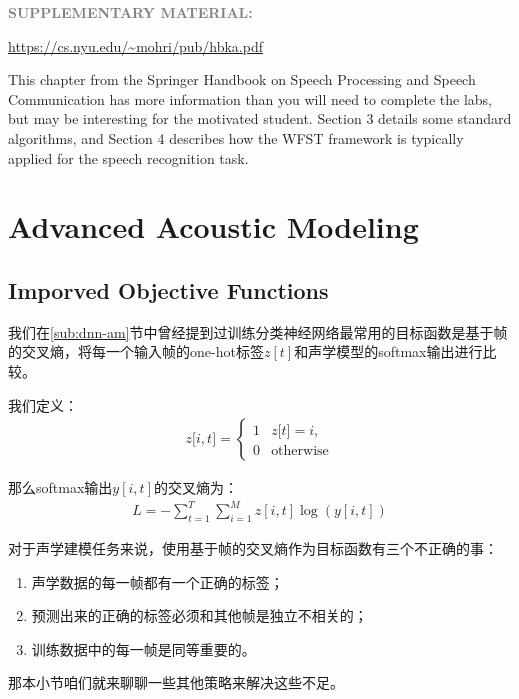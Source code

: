 {{\bf \textcolor{gray}{SUPPLEMENTARY MATERIAL:}}

\url{https://cs.nyu.edu/~mohri/pub/hbka.pdf}

This chapter from the Springer Handbook on Speech Processing and Speech Communication has more information than you will need to complete the labs, but may be interesting for the motivated student. Section 3 details some standard algorithms, and Section 4 describes how the WFST framework is typically applied for the speech recognition task.

\section{Advanced Acoustic Modeling}
\subsection{Imporved Objective Functions}
我们在\ref{sub:dnn-am}节中曾经提到过训练分类神经网络最常用的目标函数是基于帧的交叉熵，将每一个输入帧的one-hot标签$z[t]$和声学模型的softmax输出进行比较。

我们定义：
\begin{align}
z\lbrack i,t\rbrack = \left\lbrace 
\begin{matrix} 
1 & z\lbrack t\rbrack = i, \\ 
0 & \text{otherwise} 
\end{matrix} \right.
\end{align}

那么softmax输出$y[i,t]$的交叉熵为：
\begin{align}
L = - \sum_{t = 1}^{T} \sum_{i = 1}^{M} z\left\lbrack i,t \right\rbrack\log\left( y\left\lbrack i,t \right\rbrack \right)
\end{align}

对于声学建模任务来说，使用基于帧的交叉熵作为目标函数有三个不正确的事：
\begin{enumerate}
	\item 声学数据的每一帧都有一个正确的标签；
	\item 预测出来的正确的标签必须和其他帧是独立不相关的；
	\item 训练数据中的每一帧是同等重要的。
\end{enumerate}

那本小节咱们就来聊聊一些其他策略来解决这些不足。

}
